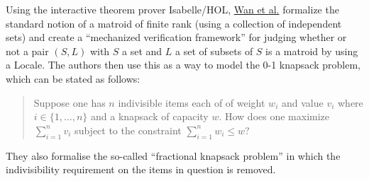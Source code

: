 \documentclass[sigplan,10pt,anonymous,review]{acmart}\settopmatter{printfolios=true,printccs=false,printacmref=false}\usepackage{graphicx} %
\begin{document}
Using the interactive theorem prover Isabelle/HOL, \href{https://link.springer.com/chapter/10.1007/978-981-96-1621-3_18}{Wan et al.}
formalize the standard notion of a matroid of finite rank (using a collection of independent sets) and create a ``mechanized verification framework''
for judging whether or not a pair $(S, L)$ with $S$ a set and $L$ a set of subsets of $S$ is a matroid by using a Locale. The authors then use
this as a way to model the 0-1 knapsack problem, which can be stated as follows:
\begin{quote}
    Suppose one has $n$ indivisible items each of of weight $w_i$ and value $v_i$ where $i \in \{1,\ldots, n\}$ and a knapsack of capacity $w$.
    How does one maximize $\sum_{i=1}^n v_i$ subject to the constraint $\sum_{i=1}^n w_i \le w$?
\end{quote}
They also formalise the so-called ``fractional knapsack problem'' in which the indivisibility requirement on the items in question is removed.
\end{document}
